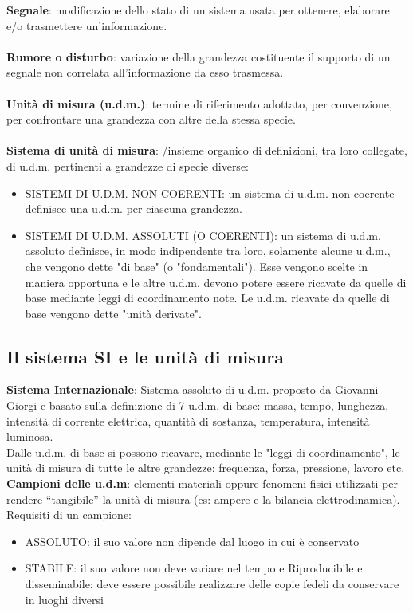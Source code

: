 \documentclass{article}
\begin{document}
\textbf{Segnale}: modificazione dello stato di un sistema usata per ottenere, elaborare e/o trasmettere un'informazione. \\ \\
\textbf{Rumore o disturbo}: variazione della grandezza costituente il supporto di un segnale non correlata all'informazione da esso trasmessa. \\ \\
\textbf{Unità di misura (u.d.m.)}: termine di riferimento adottato, per convenzione, per confrontare una grandezza con altre della stessa specie. \\ \\
\textbf{Sistema di unità di misura}: /insieme organico di definizioni, tra loro collegate, di u.d.m. pertinenti a grandezze di specie diverse:
\begin{itemize}
    \item SISTEMI DI U.D.M. NON COERENTI: un sistema di u.d.m. non coerente definisce una u.d.m. per ciascuna grandezza. 
    \item SISTEMI DI U.D.M. ASSOLUTI (O COERENTI): un sistema di u.d.m. assoluto definisce, in modo indipendente tra loro, solamente alcune u.d.m., che vengono dette "di base" (o "fondamentali"). Esse vengono scelte in maniera opportuna e le altre u.d.m. devono potere essere ricavate da quelle di base mediante leggi di coordinamento note. Le u.d.m. ricavate da quelle di base vengono dette "unità derivate". 
    
    \end{itemize}
    
\subsection{Il sistema SI e le unità di misura}
\textbf{Sistema Internazionale}: Sistema assoluto di u.d.m. proposto da Giovanni Giorgi e basato sulla definizione di 7 u.d.m. di base: massa, tempo, lunghezza, intensità di corrente elettrica, quantità di sostanza, temperatura, intensità luminosa. \\
Dalle u.d.m. di base si possono ricavare, mediante le "leggi di coordinamento", le unità di misura di tutte le altre grandezze: frequenza, forza, pressione, lavoro etc. \\
\textbf{Campioni delle u.d.m}: elementi materiali oppure fenomeni fisici utilizzati per rendere “tangibile” la unità di misura (es: ampere e la bilancia elettrodinamica). \\
\newpage
Requisiti di un campione:
\begin{itemize}
    \item ASSOLUTO: il suo valore non dipende dal luogo in cui è conservato 
    \item STABILE: il suo valore non deve variare nel tempo e Riproducibile e disseminabile: deve essere possibile realizzare delle copie fedeli da 
    conservare in luoghi diversi 

\end{itemize}
\end{document}
